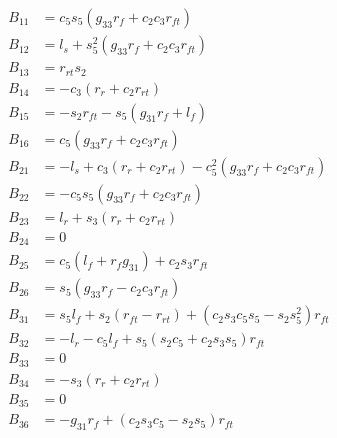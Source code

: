 \documentclass[letterpaper,11pt]{article}
\begin{document}
\begin{align*}
  B_{11} & = c_5 s_5(g_{33} r_f + c_2 c_3 r_{ft}) \\
  B_{12} & = l_s + s_5^2(g_{33} r_f + c_2 c_3 r_{ft}) \\
  B_{13} & = r_{rt} s_2 \\
  B_{14} & = -c_3 (r_r + c_2 r_{rt}) \\
  B_{15} & =   -s_2 r_{ft} - s_5 (g_{31} r_f + l_f) \\
  B_{16} & = c_5(g_{33} r_f + c_2 c_3 r_{ft})\\
  B_{21} & = -l_s + c_3(r_r + c_2 r_{rt}) - c_5^2(g_{33} r_f + c_2 c_3 r_{ft})\\
  B_{22} & =  - c_5 s_5(g_{33} r_f + c_2 c_3 r_{ft}) \\
  B_{23} & = l_r + s_3 (r_r  + c_2 r_{rt}) \\
  B_{24} & = 0 \\
  B_{25} & = c_5 (l_f + r_f g_{31}) + c_2 s_3 r_{ft} \\
  B_{26} & = s_5(g_{33} r_f - c_2 c_3 r_{ft}) \\
  B_{31} & = s_5 l_f + s_2 (r_{ft} - r_{rt}) + (c_2 s_3 c_5 s_5 - s_2 s_5^2) r_{ft}\\
  B_{32} & =  -l_r - c_5 l_f + s_5 (s_2 c_5 + c_2 s_3 s_5) r_{ft} \\
  B_{33} & =  0 \\
  B_{34} & =  -s_3 (r_r + c_2 r_{rt}) \\
  B_{35} & =  0 \\
  B_{36} & =  -g_{31} r_f + (c_2 s_3 c_5 - s_2 s_5) r_{ft}
\end{align*}


\begin{comment}
Here is the B matrix, but it is too wide to fit in portrait mode.
\begin{align*}
  \left[
  \begin{array}{cccccc}
    c_5 s_5(g_{33} r_f + c_2 c_3 r_{ft}) &
    l_s + s_5^2(g_{33} r_f + c_2 c_3 r_{ft}) &
    r_{rt} s_2 &
    -c_3 (r_r + c_2 r_{rt}) &
    -s_2 r_{ft} - s_5 (g_{31} r_f + l_f) &
    c_5(g_{33} r_f + c_2 c_3 r_{ft})
    \\
    -l_s + c_3(r_r + c_2 r_{rt}) - c_5^2(g_{33} r_f + c_2 c_3 r_{ft}) &
    - c_5 s_5(g_{33} r_f + c_2 c_3 r_{ft}) &
    l_r + s_3 (r_r  + c_2 r_{rt}) &
    0 &
    c_5 (l_f + r_f g_{31}) + c_2 s_3 r_{ft} &
    s_5(g_{33} r_f - c_2 c_3 r_{ft})
    \\
    s_5 l_f + s_2 (r_{ft} - r_{rt}) + (c_2 s_3 c_5 s_5 - s_2 s_5^2) r_{ft} &
    -l_r - c_5 l_f + s_5 (s_2 c_5 + c_2 s_3 s_5) r_{ft} &
    0 &
    -s_3 (r_r + c_2 r_{rt}) &
    0 &
    -g_{31} r_f + (c_2 s_3 c_5 - s_2 s_5) r_{ft}
  \end{array}
  \right]
\end{align*}
\end{comment}




\end{document}
